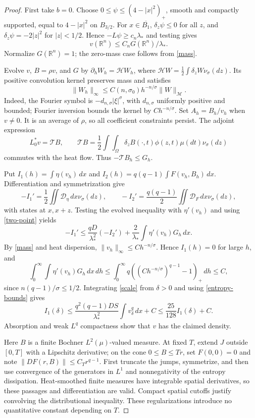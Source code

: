 \documentclass{article}
\newcommand{\R}{\mathbb R}
\newcommand{\dd}{\,d}
\newcommand{\HH}{\mathcal H}
\begin{document}
\begin{proof}
First take $b=0$. Choose $0\le\psi\le(4-|x|^2)_+$, smooth and compactly supported, equal to $4-|x|^2$ on $B_{3/2}$. For $x\in\overline{B_1}$, $\delta_z\psi\le0$ for all $z$, and $\delta_z\psi=-2|z|^2$ for $|z|<1/2$. Hence $-L\psi\ge c_n\lambda_*$ and testing gives
\begin{equation}\label{mass}
 v(\R^n)\le C_nG(\R^n)/\lambda_*.
\end{equation}
Normalize $G(\R^n)=1$; the zero-mass case follows from \eqref{mass}.

Evolve $v$, $B=\rho v$, and $G$ by $\partial_hW_h=\HH W_h$, where
$\HH W=\frac12\int\delta_zW\nu_\sigma(dz)$. Its positive convolution kernel preserves mass and satisfies
\[
 \|W_h\|_\infty\le C(n,\sigma_0)h^{-n/\sigma}\|W\|_{\mathcal M}.
\]
Indeed, the Fourier symbol is $-d_{n,\sigma}|\xi|^\sigma$, with $d_{n,\sigma}$ uniformly positive and bounded; Fourier inversion bounds the kernel by $C h^{-n/\sigma}$. Set $A_h=B_h/v_h$ when $v\ne0$. It is an average of $\rho$, so all coefficient constraints persist. The adjoint expression
\[
 L_0^*v=\mathcal T B,\qquad
 \mathcal T B=\frac12\int\int_\Omega\delta_zB(\cdot,t)\phi(z,t)\mu(dt)\nu_\sigma(dz)
\]
commutes with the heat flow. Thus $-\mathcal T B_h\le G_h$.

Put $I_1(h)=\int\eta(v_h)\dd x$ and $I_2(h)=q(q-1)\int F(v_h,B_h)\dd x$. Differentiation and symmetrization give
\[
 -I_1'=\frac12\iint\mathcal D_\eta\dd x\nu_\sigma(dz),\qquad
 -I_2'=\frac{q(q-1)}2\iint\mathcal D_F\dd x\nu_\sigma(dz),
\]
with states at $x,x+z$. Testing the evolved inequality with $\eta'(v_h)$ and using \eqref{two-point} yields
\begin{equation}\label{scale}
 -I_1'\le\frac{qD}{\lambda_*^2}(-I_2')
             +\frac2{\lambda_*}\int\eta'(v_h)G_h\dd x.
\end{equation}
By \eqref{mass} and heat dispersion, $\|v_h\|_\infty\le C h^{-n/\sigma}$. Hence $I_1(h)=0$ for large $h$, and
\[
 \int_0^\infty\int\eta'(v_h)G_h\dd x\dd h
 \le\int_0^\infty q((Ch^{-n/\sigma})^{q-1}-1)_+\dd h\le C,
\]
since $n(q-1)/\sigma\le1/2$. Integrating \eqref{scale} from $\delta>0$ and using \eqref{entropy-bounds} gives
\[
 I_1(\delta)\le\frac{q^2(q-1)DS}{\lambda_*^2}
                    \int v_\delta^q\dd x+C
 \le\frac{25}{128}I_1(\delta)+C.
\]
Absorption and weak $L^q$ compactness show that $v$ has the claimed density.

Here $B$ is a finite Bochner $L^2(\mu)$-valued measure. At fixed $T$, extend $J$ outside $[0,T]$ with a Lipschitz derivative; on the cone $0\le B\le Tr$, set $F(0,0)=0$ and note $\|DF(r,B)\|\le C_T r^{q-1}$. First truncate the jumps, symmetrize, and then use convergence of the generators in $L^1$ and nonnegativity of the entropy dissipation. Heat-smoothed finite measures have integrable spatial derivatives, so these passages and differentiation are valid. Compact spatial cutoffs justify convolving the distributional inequality. These regularizations introduce no quantitative constant depending on $T$.


\end{proof}
\end{document}
